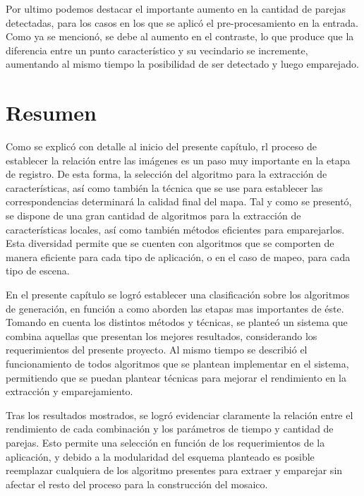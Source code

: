 Por ultimo podemos destacar el importante aumento en la cantidad de parejas detectadas, para los casos en los que se aplicó el pre-procesamiento en la entrada. Como ya se mencionó, se debe al aumento en el contraste, lo que produce que la diferencia entre un punto característico y su vecindario se incremente, aumentando al mismo tiempo la posibilidad de ser detectado y luego emparejado.


\section{Resumen}

Como se explicó con detalle al inicio del presente capítulo, rl proceso de establecer la relación entre las imágenes es un paso muy importante en la etapa de registro. De esta forma, la selección del algoritmo para la extracción de características, así como también la técnica que se use para establecer las correspondencias determinará la calidad final del mapa. Tal y como se presentó, se dispone de una gran cantidad de algoritmos para la extracción de características locales, así como también métodos eficientes para emparejarlos. Esta diversidad permite que se cuenten con algoritmos que se comporten de manera eficiente para cada tipo de aplicación, o en el caso de mapeo, para cada tipo de escena. 

En el presente capítulo se logró establecer una clasificación sobre los algoritmos de generación, en función a como aborden las etapas mas importantes de éste. Tomando en cuenta los distintos métodos y técnicas, se planteó un sistema que combina aquellas que presentan los mejores resultados, considerando los requerimientos del presente proyecto. Al mismo tiempo se describió el funcionamiento de todos algoritmos que se plantean implementar en el sistema, permitiendo que se puedan plantear técnicas para mejorar el rendimiento en la extracción y emparejamiento. 

Tras los resultados mostrados, se logró evidenciar claramente la relación entre el rendimiento de cada combinación y los parámetros de tiempo y cantidad de parejas. Esto permite una selección en función de los requerimientos de la aplicación, y debido a la modularidad del esquema planteado es posible reemplazar cualquiera de los algoritmo presentes para extraer y emparejar sin afectar el resto del proceso para la construcción del mosaico.
